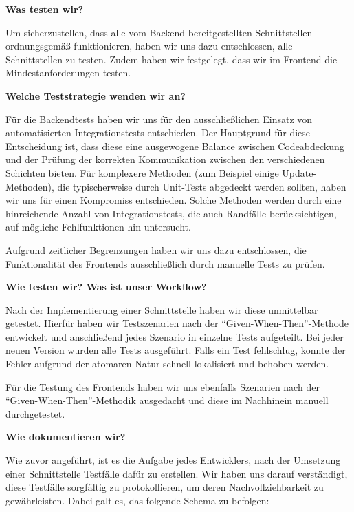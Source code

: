 \textbf{Was testen wir?}\smallskip

Um sicherzustellen, dass alle vom Backend bereitgestellten Schnittstellen ordnungsgemäß funktionieren,
haben wir uns dazu entschlossen, alle Schnittstellen zu testen.
Zudem haben wir festgelegt, dass wir im Frontend die Mindestanforderungen testen.

\bigskip
\textbf{Welche Teststrategie wenden wir an?}\smallskip

Für die Backendtests haben wir uns für den ausschließlichen Einsatz von automatisierten Integrationstests entschieden.
Der Hauptgrund für diese Entscheidung ist, dass diese eine ausgewogene Balance zwischen Codeabdeckung und der Prüfung der korrekten Kommunikation zwischen den verschiedenen Schichten bieten.
Für komplexere Methoden (zum Beispiel einige Update-Methoden), die typischerweise durch Unit-Tests abgedeckt werden sollten, haben wir uns für einen Kompromiss entschieden.
Solche Methoden werden durch eine hinreichende Anzahl von Integrationstests, die auch Randfälle berücksichtigen, auf mögliche Fehlfunktionen hin untersucht.\medskip

Aufgrund zeitlicher Begrenzungen haben wir uns dazu entschlossen, die Funktionalität des Frontends ausschließlich durch manuelle Tests zu prüfen.

\bigskip
\textbf{Wie testen wir? Was ist unser Workflow?}\smallskip

Nach der Implementierung einer Schnittstelle haben wir diese unmittelbar getestet.
Hierfür haben wir Testszenarien nach der \enquote{Given-When-Then}-Methode entwickelt
und anschließend jedes Szenario in einzelne Tests aufgeteilt.
Bei jeder neuen Version wurden alle Tests ausgeführt.
Falls ein Test fehlschlug, konnte der Fehler aufgrund der atomaren Natur schnell lokalisiert und behoben werden. \medskip

Für die Testung des Frontends haben wir uns ebenfalls Szenarien nach der \enquote{Given-When-Then}-Methodik ausgedacht und diese im Nachhinein manuell durchgetestet.

\bigskip
\textbf{Wie dokumentieren wir?}\smallskip

Wie zuvor angeführt, ist es die Aufgabe jedes Entwicklers, nach der Umsetzung einer Schnittstelle Testfälle dafür zu erstellen.
Wir haben uns darauf verständigt, diese Testfälle sorgfältig zu protokollieren, um deren Nachvollziehbarkeit zu gewährleisten.
Dabei galt es, das folgende Schema zu befolgen: \bigskip

